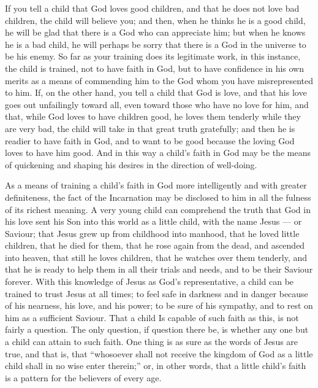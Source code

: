 \documentclass[
]{book}
\begin{document}
If you tell a child that God loves good children, and that he does not love bad children, the child will believe you; and then, when he thinks he is a good child, he will be glad that there is a God who can appreciate him; but when he knows he is a bad child, he will perhaps be sorry that there is a God in the universe to be his enemy. So far as your training does its legitimate work, in this instance, the child is trained, not to have faith in God, but to have confidence in his own merits as a means of commending him to the God whom you have misrepresented to him. If, on the other hand, you tell a child that God is love, and that his love goes out unfailingly toward all, even toward those who have no love for him, and that, while God loves to have children good, he loves them tenderly while they are very bad, the child will take in that great truth gratefully; and then he is readier to have faith in God, and to want to be good because the loving God loves to have him good. And in this way a child's faith in God may be the means of quickening and shaping his desires in the direction of well-doing.

As a means of training a child's faith in God more intelligently and with greater definiteness, the fact of the Incarnation may be disclosed to him in all the fulness of its richest meaning. A very young child can comprehend the truth that God in his love sent his Son into this world as a little child, with the name Jesus --- or Saviour; that Jesus grew up from childhood into manhood, that he loved little children, that he died for them, that he rose again from the dead, and ascended into heaven, that still he loves children, that he watches over them tenderly, and that he is ready to help them in all their trials and needs, and to be their Saviour forever. With this knowledge of Jesus as God's representative, a child can be trained to trust Jesus at all times; to feel safe in darkness and in danger because of his nearness, his love, and his power; to be sure of his sympathy, and to rest on him as a sufficient Saviour. That a child Is capable of such faith as this, is not fairly a question. The only question, if question there be, is whether any one but a child can attain to such faith. One thing is as sure as the words of Jesus are true, and that is, that ``whosoever shall not receive the kingdom of God as a little child shall in no wise enter therein;'' or, in other words, that a little child's faith is a pattern for the believers of every age.
\end{document}
